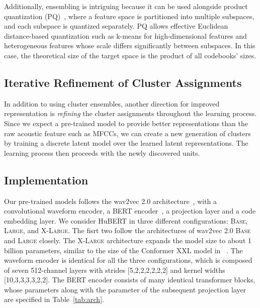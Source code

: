 Additionally, ensembling is intriguing because it can be used alongside product quantization (PQ)~\cite{gray1998quantization}, where a feature space is partitioned into multiple subspaces, and each subspace is quantized separately. PQ allows effective Euclidean distance-based quantization such as k-means for high-dimensional features and heterogeneous features whose scale differs significantly between subspaces. In this case, the theoretical size of the target space is the product of all codebooks' sizes.


\subsection{Iterative Refinement of Cluster Assignments}
In addition to using cluster ensembles, another direction for improved representation is \textit{refining} the cluster assignments throughout the learning process. Since we expect a pre-trained model to provide better representations than the raw acoustic feature such as MFCCs, we can create a new generation of clusters by training a discrete latent model over the learned latent representations. The learning process then proceeds with the newly discovered units.


\subsection{Implementation}\label{sec:impl}
Our pre-trained models follows the wav2vec 2.0 architecture~\cite{baevski2020wav2vec}, with a convolutional waveform encoder, a BERT encoder~\cite{devlin2018bert}, a projection layer and a code embedding layer. We consider HuBERT in three different configurations: \textsc{Base}, \textsc{Large}, and \textsc{X-Large}. The fisrt two follow the architectures of wav2vec 2.0 \textsc{Base} and \textsc{Large} closely. The \textsc{X-Large} architecture expands the model size to about 1 billion parameters, similar to the size of the Conformer XXL model in ~\cite{zhang2020pushing}. 
The waveform encoder is identical for all the three configurations, which is composed of seven 512-channel layers with strides [5,2,2,2,2,2,2] and kernel widths [10,3,3,3,3,2,2]. The BERT encoder consists of many identical transformer blocks, whose parameters along with the parameter of the subsequent projection layer are specified in Table~\ref{tab:arch}.

